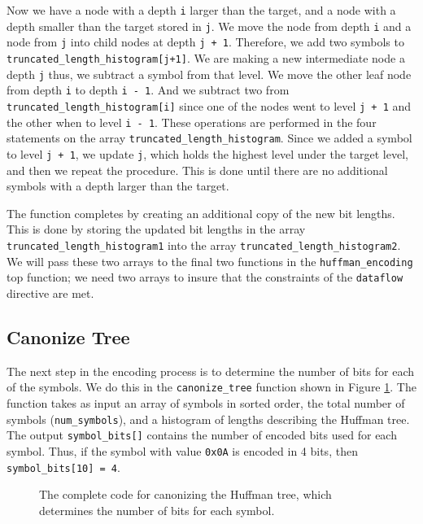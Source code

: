 Now we have a node with a depth \lstinline{i} larger than the target, and a node with a depth smaller than the target stored in \lstinline{j}. We move the node from depth \lstinline{i} and a node from \lstinline{j} into child nodes at depth \lstinline{j + 1}. Therefore, we add two symbols to \lstinline{truncated_length_histogram[j+1]}. We are making a new intermediate node a depth \lstinline{j} thus, we subtract a symbol from that level. We move the other leaf node from depth \lstinline{i} to depth \lstinline{i - 1}. And we subtract two from \lstinline{truncated_length_histogram[i]} since one of the nodes went to level \lstinline{j + 1} and the other when to level \lstinline{i - 1}. These operations are performed in the four statements on the array \lstinline{truncated_length_histogram}. Since we added a symbol to level \lstinline{j + 1}, we update \lstinline{j}, which holds the highest level under the target level, and then we repeat the procedure. This is done until there are no additional symbols with a depth larger than the target.

The function completes by creating an additional copy of the new bit lengths. This is done by storing the updated bit lengths in the array \lstinline{truncated_length_histogram1} into the array \lstinline{truncated_length_histogram2}. We will pass these two arrays to the final two functions in the \lstinline{huffman_encoding} top function; we need two arrays to insure that the constraints of the \lstinline{dataflow} directive are met.

\subsection{Canonize Tree}
\label{sec:huffman_canonize_tree}

The next step in the encoding process is to determine the number of bits for each of the symbols. We do this in the \lstinline{canonize_tree} function shown in Figure \ref{fig:huffman_canonize_tree.cpp}. The function takes as input an array of symbols in sorted order, the total number of symbols (\lstinline{num_symbols}), and a histogram of lengths describing the Huffman tree. The output \lstinline{symbol_bits[]} contains the number of encoded bits used for each symbol. Thus, if the symbol with value \lstinline{0x0A} is encoded in 4 bits, then \lstinline{symbol_bits[10] = 4}. 

\begin{figure}

\caption{ The complete code for canonizing the Huffman tree, which determines the number of bits for each symbol. }
\label{fig:huffman_canonize_tree.cpp}
\end{figure}

